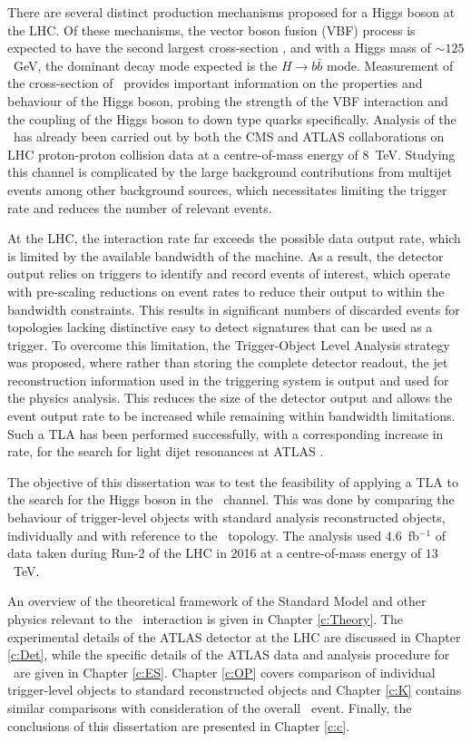 There are several distinct production mechanisms proposed for a Higgs boson at the LHC. Of these mechanisms, the vector boson fusion (VBF) process is expected to have the second largest cross-section \cite{LHCHiggsCS}, and with a Higgs mass of $\sim125$~GeV, the dominant decay mode expected \cite{HDECAY} is the $H\rightarrow b\bar{b}$ mode. Measurement of the cross-section of \VBFHBB\ provides important information on the properties and behaviour of the Higgs boson, probing the strength of the VBF interaction and the coupling of the Higgs boson to down type quarks specifically. Analysis of the \VBFHBB\ has already been carried out by both the CMS \cite{cmsvbfhbb} and ATLAS \cite{VBFHbb8tev} collaborations on LHC proton-proton collision data at a centre-of-mass energy of $8$~TeV. Studying this channel is complicated by the large background contributions from multijet events among other background sources, which necessitates limiting the trigger rate and reduces the number of relevant events.

At the LHC, the interaction rate far exceeds the possible data output rate, which is limited by the available bandwidth of the machine. As a result, the detector output relies on triggers to identify and record events of interest, which operate with pre-scaling reductions on event rates to reduce their output to within the bandwidth constraints. This results in significant numbers of discarded events for topologies lacking distinctive easy to detect signatures that can be used as a trigger. To overcome this limitation, the Trigger-Object Level Analysis strategy was proposed, where rather than storing the complete detector readout, the jet reconstruction information used in the triggering system is output and used for the physics analysis. This reduces the size of the detector output and allows the event output rate to be increased while remaining within bandwidth limitations. Such a TLA has been performed successfully, with a corresponding increase in rate, for the search for light dijet resonances at ATLAS \cite{tla}.

The objective of this dissertation was to test the feasibility of applying a TLA to the search for the Higgs boson in the \VBFHBB\ channel. This was done by comparing the behaviour of trigger-level objects with standard analysis reconstructed objects, individually and with reference to the \VBFHBB\ topology. The analysis used $4.6$~fb$^{-1}$ of data taken during Run-2 of the LHC in 2016 at a centre-of-mass energy of $13$~TeV.

\newpage
An overview of the theoretical framework of the Standard Model and other physics relevant to the \VBFHBB\ interaction is given in Chapter \ref{c:Theory}. The experimental details of the ATLAS detector at the LHC are discussed in Chapter \ref{c:Det}, while the specific details of the ATLAS data and analysis procedure for \VBFHBB\ are given in Chapter \ref{c:ES}. Chapter \ref{c:OP} covers comparison of individual trigger-level objects to standard reconstructed objects and Chapter \ref{c:K} contains similar comparisons with consideration of the overall \VBFHBB\ event. Finally, the conclusions of this dissertation are presented in Chapter \ref{c:c}.


